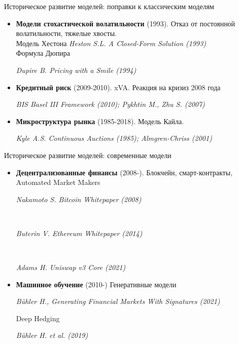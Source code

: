\documentclass{beamer}
\begin{document}
\begin{frame}{Историческое развитие моделей: поправки к классическим моделям}
\footnotesize
\begin{itemize}
\item \textbf{Модели стохастической волатильности} (1993). Отказ от постоянной волатильности, тяжелые хвосты. \\
Модель Хестона \scriptsize{\textit{Heston S.L. A Closed-Form Solution (1993)}}
\\Формула Дюпира 
\begin{scriptsize}{\textit{Dupire B. Pricing with a Smile (1994)}}\end{scriptsize}

\item \textbf{Кредитный риск} (2009-2010). xVA. Реакция на кризиз 2008 года \\
\begin{scriptsize}{\textit{BIS Basel III Framework (2010); Pykhtin M., Zhu S. (2007)}}\end{scriptsize}

\item \textbf{Микроструктура рынка} (1985-2018). Модель Кайла. 
\begin{scriptsize}{\textit{Kyle A.S. Continuous Auctions (1985); Almgren-Chriss (2001)}}\end{scriptsize}
\end{itemize}
\end{frame}


\begin{frame}{Историческое развитие моделей: современные модели}
\footnotesize
\begin{itemize}
\item \textbf{Децентрализованные финансы} (2008-). Блокчейн, смарт-контракты, Automated Market Makers\\
\begin{scriptsize}{\textit{Nakamoto S. Bitcoin Whitepaper (2008)}}\end{scriptsize} \\
\begin{scriptsize}{\textit{Buterin V. Ethereum Whitepaper (2014)}}\end{scriptsize} \\
\begin{scriptsize}{\textit{Adams H. Uniswap v3 Core (2021)}}\end{scriptsize}

\item \textbf{Машинное обучение} (2010-) Генеративные модели
\begin{scriptsize} \textit{Bühler H., Generating Financial Markets With Signatures (2021)} \end{scriptsize}
Deep Hedging \\
\begin{scriptsize} \textit{Bühler H. et al. (2019)} \end{scriptsize}
\end{itemize}
\end{frame}
\end{document}
